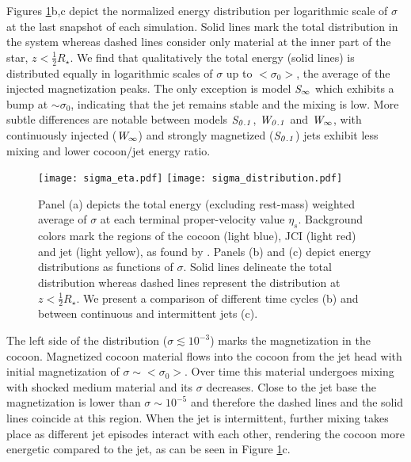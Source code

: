 \documentclass[fleqn,usenatbib]{mnras}
\newcommand{\Wa}{{\it W_{0.1}}}
\newcommand{\Sa}{{\it S_{0.1}}}
\newcommand{\Wc}{{\it W_{\infty}}}
\newcommand{\Sc}{{\it S_{\infty}}}
\newcommand{\sigz}{{<\sigma_0>}}
\begin{document}
	Figures \ref{fig:sigma_dist}b,c depict the normalized energy distribution per logarithmic scale of $ \sigma $ at the last snapshot of each simulation. Solid lines mark the total distribution in the system whereas dashed lines consider only material at the inner part of the star, $ z < \frac{1}{2}R_\star $.
	We find that qualitatively the total energy (solid lines) is distributed equally in logarithmic scales of $ \sigma $ up to $ \sigz $, the average of the injected magnetization peaks. The only exception is model $ \Sc $ which exhibits a bump at $ \sim \sigma_0 $, indicating that the jet remains stable and the mixing is low.
	More subtle differences are notable between models $ \Sa $, $ \Wa $ and $ \Wc $, with continuously injected ($ \Wc $) and strongly magnetized ($\Sa $) jets exhibit less mixing and lower cocoon/jet energy ratio.
	
	\begin{figure}
		\centering
		\texttt{[image: sigma\_eta.pdf]}
		\texttt{[image: sigma\_distribution.pdf]}
		\caption[Energy as a function of $ \sigma $]{
			Panel (a) depicts the total energy (excluding rest-mass) weighted average of $ \sigma $ at each terminal proper-velocity value $ \eta_s $. Background colors mark the regions of the cocoon (light blue), JCI (light red) and jet (light yellow), as found by \citet{Gottlieb2021}.
			Panels (b) and (c) depict energy distributions as functions of $ \sigma $. Solid lines delineate the total distribution whereas dashed lines represent the distribution at $ z < \frac{1}{2}R_\star $.
			We present a comparison of different time cycles (b) and between continuous and intermittent jets (c).
		}
		\label{fig:sigma_dist}
	\end{figure}
	
	The left side of the distribution ($ \sigma \lesssim 10^{-3} $) marks the magnetization in the cocoon. Magnetized cocoon material flows into the cocoon from the jet head with initial magnetization of $ \sigma \sim \sigz $.
	Over time this material undergoes mixing with shocked medium material and its $\sigma$ decreases. Close to the jet base the magnetization is lower than $ \sigma \sim 10^{-5} $ and therefore the dashed lines and the solid lines coincide at this region.
	When the jet is intermittent, further mixing takes place as different jet episodes interact with each other, rendering the cocoon more energetic compared to the jet, as can be seen in Figure \ref{fig:sigma_dist}c.
	
\end{document}
